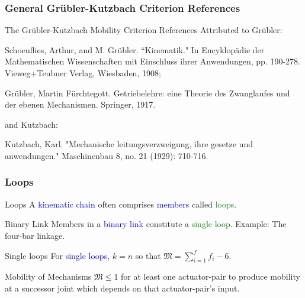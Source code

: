 \begin{frame}
	\frametitle{ General Gr{\"u}bler-Kutzbach Criterion References}
		
	\begin{block}{The Gr{\"u}bler-Kutzbach Mobility Criterion References}
		Attributed to Gr{\"u}bler: 
		\begin{description}
			\item \footnotesize{Schoenflies, Arthur, and M. Grübler. ``Kinematik." In Encyklopädie der Mathematischen Wissenschaften mit Einschluss ihrer Anwendungen, pp. 190-278. Vieweg+Teubner Verlag, Wiesbaden, 1908};
			\item \footnotesize{Grübler, Martin Fürchtegott. Getriebelehre: eine Theorie des Zwanglaufes und der ebenen Mechanismen. Springer, 1917}.
		\end{description}
	and Kutzbach:
		\begin{description}
			\item \footnotesize{Kutzbach, Karl. "Mechanische leitungsverzweigung, ihre gesetze und anwendungen." Maschinenbau 8, no. 21 (1929): 710-716.}
		\end{description}
	\end{block}
\end{frame}

\begin{frame}
	\frametitle{Loops}	
	\begin{block}{Loops}
		A \textcolor{blue}{kinematic chain} often comprises \textcolor{blue}{members} called \textcolor{green}{loops}. 
	\end{block}
	
	\begin{block}{Binary Link}
		Members in a \textcolor{blue}{binary link} constitute a \textcolor{green}{single loop}. Example: The four-bar linkage. 
	\end{block}	
	
	\begin{block}{Single loops}
		For \textcolor{blue}{single loops}, $k=n$ so that $\mathfrak{M}=\sum_{i=1}^{f} f_i - 6$. 
	\end{block}
	
	\begin{block}{Mobility of Mechanisms}
		$\mathfrak{M}\le 1$ for at least one actuator-pair to produce mobility at a successor joint which depends on that actuator-pair's input. 
	\end{block}
\end{frame}


